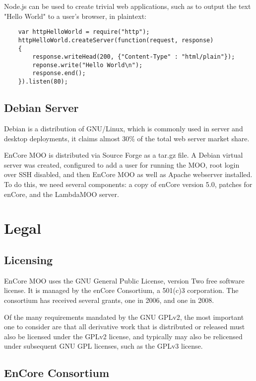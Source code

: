 \documentclass[12pt, letterpaper]{report}
\begin{document}
	\par
    Node.js can be used to create trivial web applications, such as to output the text "Hello World" to a user's browser, in plaintext:
    
    \begin{lstlisting}
    var httpHelloWorld = require("http");
    httpHelloWorld.createServer(function(request, response)
    {
        response.writeHead(200, {"Content-Type" : "html/plain"});
        reponse.write("Hello World\n");
        response.end();
    }).listen(80);
    \end{lstlisting}
    
    
	\section{Debian Server}
	\par
	Debian is a distribution of GNU/Linux, which is commonly used in server and desktop deployments, it claims almost 30\% of the total web server market share.
	
	\par 
	EnCore MOO is distributed via Source Forge as a tar.gz file. A Debian virtual server was created, configured to add a user for running the MOO, root login over SSH disabled, and then EnCore MOO as well as Apache webserver installed. To do this, we need several components: a copy of enCore version 5.0, patches for enCore, and the LambdaMOO server.
    	
	\chapter{Legal}
	\section{Licensing}
	\par
	EnCore MOO uses the GNU General Public License, version Two free software license. It is managed by the enCore Consortium, a 501(c)3 corporation. The consortium has received several grants, one in 2006, and one in 2008.
	
	\par
	Of the many requirements mandated by the GNU GPLv2, the most important one to consider are that all derivative work that is distributed or released must also be licensed under the GPLv2 license, and typically may also be relicensed under subsequent GNU GPL licenses, such as the GPLv3 license.
	
	\section{EnCore Consortium}
	\par
    
\end{document}
